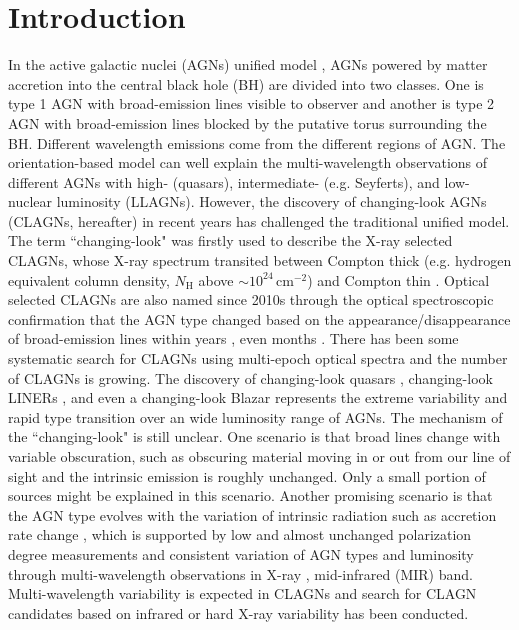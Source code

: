 \documentclass[linenumbers]{aastex631}
\begin{document}
\section{Introduction} \label{sec:intro}
In the active galactic nuclei (AGNs) unified model \citep[e.g.][]{1993ARA&A..31..473A}, AGNs powered by matter accretion into the central black hole (BH) are divided into two classes. One is type 1 AGN with broad-emission lines visible to observer and another is type 2 AGN with broad-emission lines blocked by the putative torus surrounding the BH. Different wavelength emissions come from the different regions of AGN. The orientation-based model can well explain the multi-wavelength observations of different AGNs with high- (quasars), intermediate- (e.g. Seyferts), and low-nuclear luminosity (LLAGNs). However, the discovery of changing-look AGNs (CLAGNs, hereafter) in recent years has challenged the traditional unified model. The term ``changing-look" was firstly used to describe the X-ray selected CLAGNs, whose X-ray spectrum transited between Compton thick (e.g. hydrogen equivalent column density, $N_\mathrm{H}$ above $\sim 10^{24}\,\mathrm{cm}^{-2}$) and Compton thin \citep[e.g. $N_\mathrm{H} \sim  10^{22}\,\mathrm{cm}^{-2}$; see ][]{2003MNRAS.342..422M}. Optical selected CLAGNs are also named since 2010s through the optical spectroscopic confirmation that the AGN type changed based on the appearance/disappearance of broad-emission lines within years \citep[e.g.][]{2014ApJ...796..134D,2014ApJ...788...48S,2020ApJ...890L..29A,2020ApJ...901....1W}, even months \citep[e.g.][]{2019MNRAS.487.4057K,2019ApJ...883...94T}. There has been some systematic search for CLAGNs using multi-epoch optical spectra \citep[e.g.][]{2018ApJ...862..109Y,2021MNRAS.503.2583S,2021A&A...650A..33P} and the number of CLAGNs is growing. The discovery of changing-look quasars \citep[e.g.][]{2015ApJ...800..144L,2021PASJ...73..122N}, changing-look LINERs \citep{2019ApJ...883...31F}, and even a changing-look Blazar \citep{2021ApJ...913..146M} represents the extreme variability and rapid type transition over an wide luminosity range of AGNs. The mechanism of the ``changing-look" is still unclear. One scenario is that broad lines change with variable obscuration, such as obscuring material moving in or out from our line of sight\citep[e.g.][]{2013MNRAS.436.1615M,2014MNRAS.443.2862A,2015ApJ...815...55R,2018MNRAS.481.2470T,2019ApJ...887...15W} and the intrinsic emission is roughly unchanged. Only a small portion of sources might be explained in this scenario. Another promising scenario is that the AGN type evolves with the variation of intrinsic radiation such as accretion rate change \citep[e.g.][]{1984MNRAS.211P..33P,2014MNRAS.438.3340E}, which is supported by low and almost unchanged polarization degree measurements \citep{2019sf2a.conf..509M} and consistent variation of AGN types and luminosity through multi-wavelength observations in X-ray \citep[e.g.][]{2021MNRAS.508..144G}, mid-infrared (MIR) \citep[e.g.][]{2017ApJ...846L...7S,2018ApJ...864...27S} band. Multi-wavelength variability is expected in CLAGNs and search for CLAGN candidates based on infrared \citep[][]{2020ApJ...889...46S} or hard X-ray \citep[][]{2021AIPC.2319d0007H} variability has been conducted. 
\end{document}
